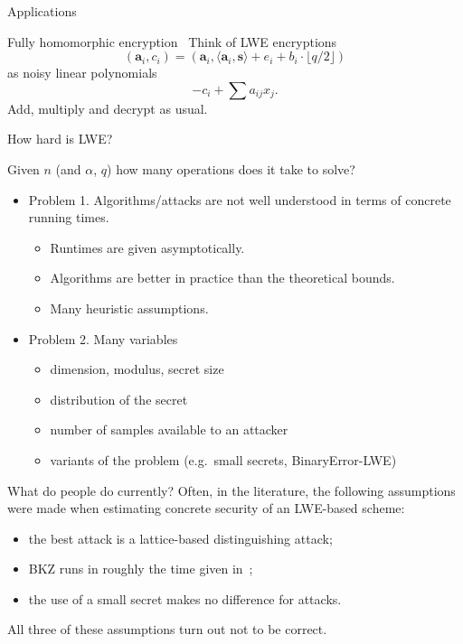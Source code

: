 \documentclass[10pt,compress]{beamer}
\renewcommand{\vec}[1]{\mathbf{#1}\xspace}
\newcommand{\ip}[2]{\langle #1, #2 \rangle}
\renewcommand{\vec}[1]{\mathbf{#1}\xspace}
\begin{document}
\begin{frame}{Applications}
  \begin{alertblock}{Fully homomorphic encryption~\cite{FOCS:BraVai11,AC:AFFP11}}
    Think of LWE encryptions \[(\vec{a}_i,c_i) =  (\vec{a}_i,\ip{\vec{a}_i}{\vec{s}} + e_i + b_i \cdot \lfloor q/2 \rfloor)\] as noisy linear polynomials \[-c_i + \sum a_{ij} x_j .\] Add, multiply and decrypt as usual.
  \end{alertblock}
\end{frame}


\begin{frame}{How hard is LWE?}
  
  Given $n$ (and $\alpha$, $q$) how many operations does it take to solve? 

  \begin{itemize}
  \item \alert{Problem 1.} Algorithms/attacks are not well understood in terms of concrete running times.
    \begin{itemize}
    \item Runtimes are given asymptotically.
    \item Algorithms are better in practice than the theoretical bounds.
    \item Many heuristic assumptions.
    \end{itemize} 

  \item \alert{Problem 2.} Many variables
    \begin{itemize}
    \item dimension, modulus, secret size
    \item distribution of the secret
    \item number of samples available to an attacker
    \item variants of the problem (e.g.\ small secrets, BinaryError-LWE)
    \end{itemize}
  \end{itemize}
\end{frame}

\begin{frame}{What do people do currently?}
  Often, in the literature, the following assumptions were made when estimating concrete security of an LWE-based scheme:

  \begin{itemize}
  \item the best attack is a lattice-based \alert{distinguishing attack};
  \item \alert{BKZ} runs in roughly the time given in~\cite{RSA:LinPei11};
  \item the use of a \alert{small secret} makes no difference for attacks.
  \end{itemize} 

  All three of these assumptions turn out not to be correct.

\end{frame}
\end{document}
